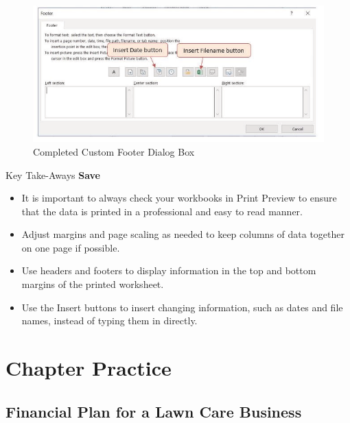 \begin{figure}[H]
	\centering
	\includegraphics[width=\maxwidth{.95\linewidth}]{gfx/ch02_fig46}
	\caption{Completed Custom Footer Dialog Box}
	\label{02:fig46}
\end{figure}

\begin{center}
	\begin{tkwbox}{Key Take-Aways}
		\textbf{Save}
		\\
		\begin{itemize}
			\setlength{\itemsep}{0pt}
			\setlength{\parskip}{0pt}
			\setlength{\parsep}{0pt}
			
			\item It is important to always check your workbooks in Print Preview to ensure that the data is printed in a professional and easy to read manner.
			\item Adjust margins and page scaling as needed to keep columns of data together on one page if possible.
			\item Use headers and footers to display information in the top and bottom margins of the printed worksheet.
			\item Use the Insert buttons to insert changing information, such as dates and file names, instead of typing them in directly.
			
		\end{itemize}
	\end{tkwbox}
\end{center}

\section{Chapter Practice}

\subsection{Financial Plan for a Lawn Care Business}

